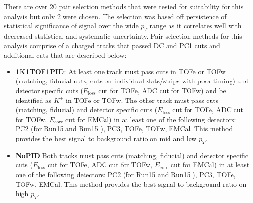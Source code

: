 There are over 20 pair selection methods that were tested for suitability for this analysis but only 2 were chosen. 
The selection was based off persistence of statistical significance of \kstar signal over the wide $p_T$ range as it correlates well with decreased statistical and systematic uncertainty.
Pair selection methods for this analysis comprise of a charged tracks that passed DC and PC1 cuts and additional cuts that are described below:

\begin{itemize}
   \item \textbf{1K1TOF1PID}: At least one track must pass cuts in TOFe or TOFw (matching, fiducial cuts, cuts on individual slats/strips with poor timing) and detector specific cuts ($E_{\text{loss}}$ cut for TOFe, ADC cut for TOFw) and be identified as $K^\pm$ in TOFe or TOFw. 
   The other track must pass cuts (matching, fiducial) and detector specific cuts ($E_{\text{loss}}$ cut for TOFe, ADC cut for TOFw, $E_{\text{core}}$ cut for EMCal) in at least one of the following detectors: PC2 (for Run15 \pAl and Run15 \pAu), PC3, TOFe, TOFw, EMCal.
   This method provides the best signal to background ratio on mid and low $p_T$.
   \label{term:1k1tof1pid}
   \item \textbf{NoPID} Both tracks must pass cuts (matching, fiducial) and detector specific cuts ($E_{\text{loss}}$ cut for TOFe, ADC cut for TOFw, $E_{\text{core}}$ cut for EMCal) in at least one of the following detectors: PC2 (for Run15 \pAl and Run15 \pAu), PC3, TOFe, TOFw, EMCal.
   This method provides the best signal to background ratio on high $p_T$.
   \label{term:nopid}
\end{itemize}
